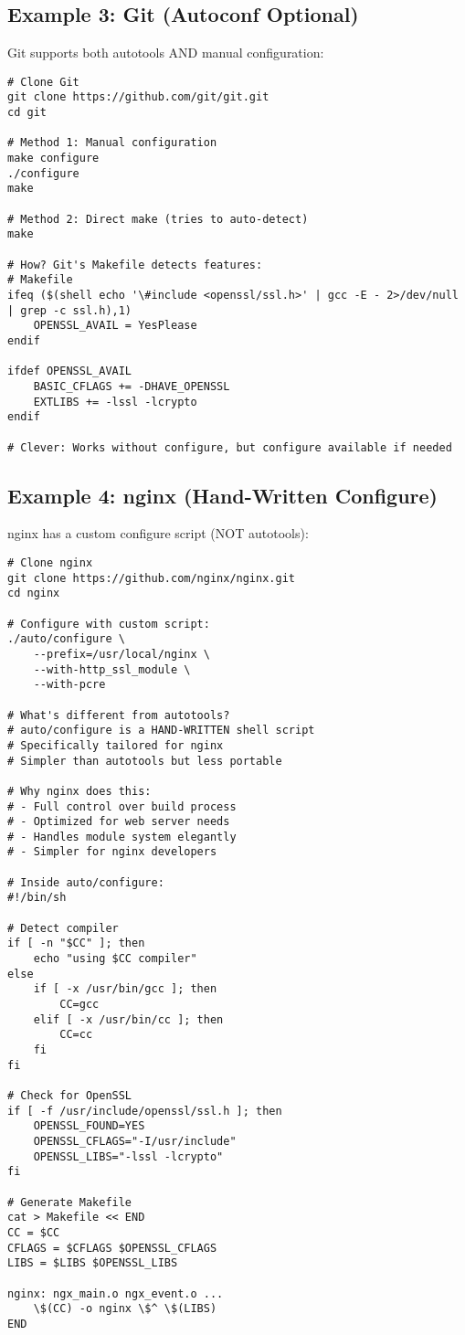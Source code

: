\subsection{Example 3: Git (Autoconf Optional)}

Git supports both autotools AND manual configuration:

\begin{lstlisting}
# Clone Git
git clone https://github.com/git/git.git
cd git

# Method 1: Manual configuration
make configure
./configure
make

# Method 2: Direct make (tries to auto-detect)
make

# How? Git's Makefile detects features:
# Makefile
ifeq ($(shell echo '\#include <openssl/ssl.h>' | gcc -E - 2>/dev/null | grep -c ssl.h),1)
    OPENSSL_AVAIL = YesPlease
endif

ifdef OPENSSL_AVAIL
    BASIC_CFLAGS += -DHAVE_OPENSSL
    EXTLIBS += -lssl -lcrypto
endif

# Clever: Works without configure, but configure available if needed
\end{lstlisting}

\subsection{Example 4: nginx (Hand-Written Configure)}

nginx has a custom configure script (NOT autotools):

\begin{lstlisting}
# Clone nginx
git clone https://github.com/nginx/nginx.git
cd nginx

# Configure with custom script:
./auto/configure \
    --prefix=/usr/local/nginx \
    --with-http_ssl_module \
    --with-pcre

# What's different from autotools?
# auto/configure is a HAND-WRITTEN shell script
# Specifically tailored for nginx
# Simpler than autotools but less portable

# Why nginx does this:
# - Full control over build process
# - Optimized for web server needs
# - Handles module system elegantly
# - Simpler for nginx developers

# Inside auto/configure:
#!/bin/sh

# Detect compiler
if [ -n "$CC" ]; then
    echo "using $CC compiler"
else
    if [ -x /usr/bin/gcc ]; then
        CC=gcc
    elif [ -x /usr/bin/cc ]; then
        CC=cc
    fi
fi

# Check for OpenSSL
if [ -f /usr/include/openssl/ssl.h ]; then
    OPENSSL_FOUND=YES
    OPENSSL_CFLAGS="-I/usr/include"
    OPENSSL_LIBS="-lssl -lcrypto"
fi

# Generate Makefile
cat > Makefile << END
CC = $CC
CFLAGS = $CFLAGS $OPENSSL_CFLAGS
LIBS = $LIBS $OPENSSL_LIBS

nginx: ngx_main.o ngx_event.o ...
	\$(CC) -o nginx \$^ \$(LIBS)
END
\end{lstlisting}

